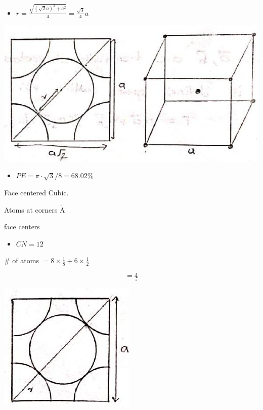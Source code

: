 \documentclass[10pt]{article}
\def\AA{\mathring{\mathrm{A}}}
\begin{document}
\begin{itemize}
  \item $r=\frac{\sqrt{(\sqrt{2} a)^{2}+a^{2}}}{4}=\frac{\sqrt{3}}{4} a$
\end{itemize}

\begin{center}
\includegraphics[max width=\textwidth]{2024_06_16_30d750483617f1939202g-07(3)}
\end{center}

\begin{itemize}
  \item $P E=\pi \cdot \sqrt{3} / 8=68.02 \%$
\end{itemize}

Face centered Cubic.

Atoms at corners $\AA$

face centers

\begin{itemize}
  \item $C N=12$
\end{itemize}

\# of atoms $=8 \times \frac{1}{8}+6 \times \frac{1}{2}$

$$
=\underline{\underline{4}}
$$

\begin{center}
\includegraphics[max width=\textwidth]{2024_06_16_30d750483617f1939202g-07(1)}
\end{center}
\end{document}
